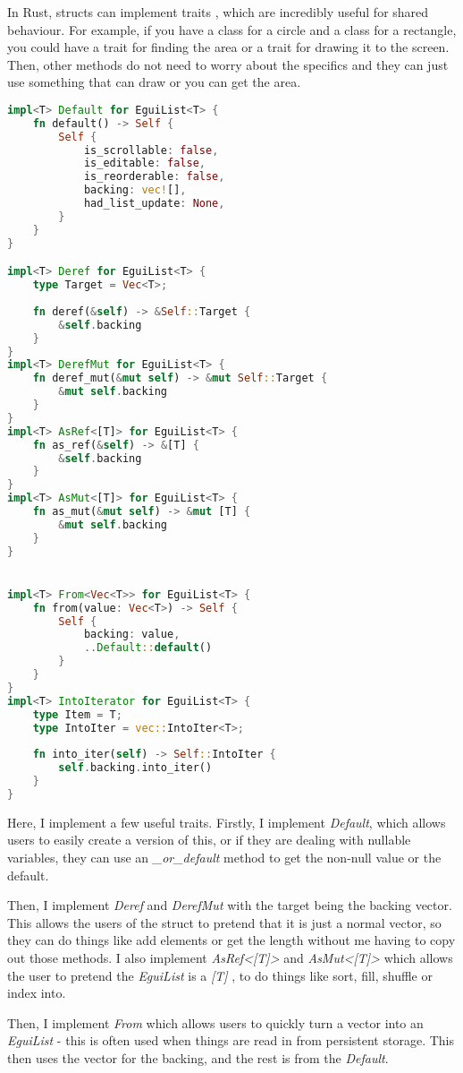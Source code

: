 \documentclass{article}
\begin{document}
\begin{multicols*}{2}
In Rust, structs can implement traits \autocite{TraitRust}, which are incredibly useful for shared behaviour. For example, if you have a class for a circle and a class for a rectangle, you could have a trait for finding the area or a trait for drawing it to the screen. Then, other methods do not need to worry about the specifics and they can just use something that can draw or you can get the area.

\begin{lstlisting}[language=Rust]
impl<T> Default for EguiList<T> {
	fn default() -> Self {
		Self {
			is_scrollable: false,
			is_editable: false,
			is_reorderable: false,
			backing: vec![],
			had_list_update: None,
		}
	}
}

impl<T> Deref for EguiList<T> {
	type Target = Vec<T>;
	
	fn deref(&self) -> &Self::Target {
		&self.backing
	}
}
impl<T> DerefMut for EguiList<T> {
	fn deref_mut(&mut self) -> &mut Self::Target {
		&mut self.backing
	}
}
impl<T> AsRef<[T]> for EguiList<T> {
	fn as_ref(&self) -> &[T] {
		&self.backing
	}
}
impl<T> AsMut<[T]> for EguiList<T> {
	fn as_mut(&mut self) -> &mut [T] {
		&mut self.backing
	}
}


impl<T> From<Vec<T>> for EguiList<T> {
	fn from(value: Vec<T>) -> Self {
		Self {
			backing: value,
			..Default::default()
		}
	}
}
impl<T> IntoIterator for EguiList<T> {
	type Item = T;
	type IntoIter = vec::IntoIter<T>;
	
	fn into_iter(self) -> Self::IntoIter {
		self.backing.into_iter()
	}
}
\end{lstlisting}

Here, I implement a few useful traits. Firstly, I implement \textit{Default}, which allows users to easily create a version of this, or if they are dealing with nullable variables, they can use an \textit{\_or\_default} method to get the non-null value or the default.

Then, I implement \textit{Deref} and \textit{DerefMut} with the target being the backing vector. This allows the users of the struct to pretend that it is just a normal vector, so they can do things like add elements or get the length without me having to copy out those methods. I also implement \textit{AsRef<[T]>} and \textit{AsMut<[T]>} which allows the user to pretend the \textit{EguiList} is a \textit{[T]} \autocite{SliceRust}, to do things like sort, fill, shuffle or index into.

Then, I implement \textit{From} which allows users to quickly turn a vector into an \textit{EguiList} - this is often used when things are read in from persistent storage. This then uses the vector for the backing, and the rest is from the \textit{Default}. 


\end{multicols*}
\end{document}
